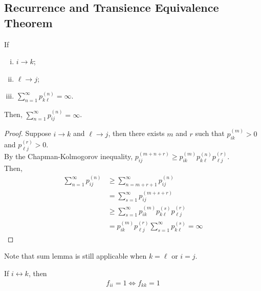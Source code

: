 \documentclass{article}
\newcommand{\upn}[0]{^{(n)}}
\begin{document}
    \subsection{Recurrence and Transience Equivalence Theorem}
    \begin{lemma}
    	If
    	\begin{enumerate}[(i)]
    		\item $i \to k$;
    		\item $\ell \to j$;
    		\item $\sum_{n=1}^\infty p_{k \ell}\upn = \infty$.
    	\end{enumerate}
    	Then, $\sum_{n=1}^\infty p_{ij}\upn = \infty$.
    \end{lemma}
    
    \begin{proof}
    	Suppose $i \to k$ and $\ell \to j$, then there exists $m$ and $r$ such that $p_{ik}^{(m)} > 0$ and $p_{\ell j}^{(r)} > 0$. \\
    	By the Chapman-Kolmogorov inequality, $p_{ij}^{(m+n+r)} \geq p_{ik}^{(m)} p_{k \ell}^{(n)} p_{\ell j}^{(r)}$. \\
    	Then,
    	\begin{align}
    		\sum_{n=1}^\infty p_{ij}\upn
    		&\geq \sum_{n=m+r+1}^\infty p_{ij}\upn \\
    		&= \sum_{s=1}^\infty p_{ij}^{(m+s+r)} \\
    		&\geq \sum_{s=1}^\infty p_{ik}^{(m)} p_{k \ell}^{(s)} p_{\ell j}^{(r)} \\
    		&= p_{ik}^{(m)} p_{\ell j}^{(r)} \sum_{s=1}^\infty p_{k \ell}^{(s)} = \infty
    	\end{align}
    \end{proof}

	\begin{remark}
		Note that sum lemma is still applicable when $k = \ell$ or $i = j$.		
	\end{remark}

    \begin{corollary}
    	If $i \leftrightarrow k$, then
    	\begin{align}
    		f_{ii} = 1 \iff f_{kk} = 1
    	\end{align}
    \end{corollary}
    
\end{document}
